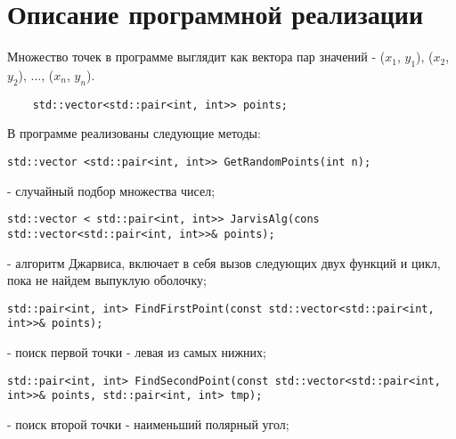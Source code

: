 \documentclass{article}
\begin{document}
\newpage

\section{Описание программной реализации}
Множество точек в программе выглядит как вектора пар значений - {($x_{1}$, $y_{1}$), ($x_{2}$, $y_{2}$), ..., ($x_{n}$, $y_{n}$)}.

\vspace{10pt}
\begin{lstlisting}
	std::vector<std::pair<int, int>> points;
\end{lstlisting}
\vspace{-25pt}

\par В программе реализованы следующие методы:

\vspace{10pt}
\begin{lstlisting}
std::vector <std::pair<int, int>> GetRandomPoints(int n);
\end{lstlisting}
\vspace{-25pt}

- случайный подбор множества чисел;

\vspace{10pt}
\begin{lstlisting}
std::vector < std::pair<int, int>> JarvisAlg(cons std::vector<std::pair<int, int>>& points);
\end{lstlisting}
\vspace{-25pt}

- алгоритм Джарвиса, включает в себя вызов следующих двух функций и цикл, пока не найдем выпуклую оболочку;

\vspace{10pt}
\begin{lstlisting}
std::pair<int, int> FindFirstPoint(const std::vector<std::pair<int, int>>& points);
\end{lstlisting}
\vspace{-25pt}

- поиск первой точки - левая из самых нижних;

\vspace{10pt}
\begin{lstlisting}
std::pair<int, int> FindSecondPoint(const std::vector<std::pair<int, int>>& points, std::pair<int, int> tmp);
\end{lstlisting}
\vspace{-25pt}

- поиск второй точки - наименьший полярный угол;
\end{document}
